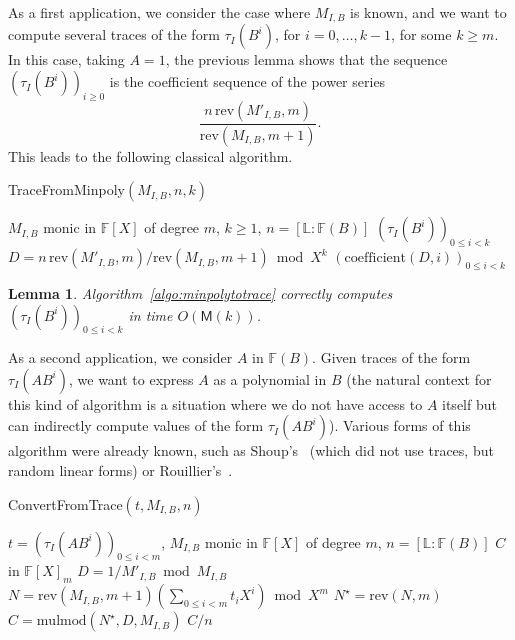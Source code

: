 \documentclass[12pt]{article}
\def\M {\ensuremath{\mathsf{M}}}
\def\F {\ensuremath{\mathbb{F}}}
\def\L {\ensuremath{\mathbb{L}}}
\def\coeff {\ensuremath{\mathrm{coefficient}}}
\def\mulmod {\ensuremath{\mathrm{mulmod}}}
\def\rev {\ensuremath{\mathrm{rev}}}
\newtheorem{Lemma}{Lemma}
\begin{document}
As a first application, we consider the case where $M_{I,B}$ is known,
and we want to compute several traces of the form $\tau_I(B^i)$, for
$i=0,\dots,k-1$, for some $k \ge m$. In this case, taking $A=1$, the
previous lemma shows that the sequence $(\tau_I(B^i))_{i \ge 0}$ is
the coefficient sequence of the power series
  $$ \frac{n\, \rev(M'_{I,B} ,m)}{\rev(M_{I,B},m+1)}.$$ This leads to
the following classical algorithm.

\begin{algorithm}[H]
  \caption{TraceFromMinpoly$(M_{I,B}, n, k)$}
  \begin{algorithmic}[1]
    \REQUIRE  $M_{I,B}$ monic in $\F[X]$ of degree $m$, $k \ge 1$, $n=[\L:\F(B)]$    
    \ENSURE $(\tau_I(B^i))_{0 \le i < k}$
    \STATE\label{algo:minpolytotrace:1} $D = n\, \rev(M'_{I,B}, m)/\rev(M_{I,B}, m+1) \bmod X^k$
    \RETURN $(\coeff(D,i))_{0 \le i < k}$
  \end{algorithmic}
  \label{algo:minpolytotrace}
\end{algorithm}

\begin{Lemma}\label{lemma:computetrace}
  Algorithm~\ref{algo:minpolytotrace} correctly computes
  $(\tau_I(B^i))_{0 \le i < k}$ in time $O(\M(k))$.
\end{Lemma}

As a second application, we consider $A$ in $\F(B)$. Given traces of
the form $\tau_I(A B^i)$, we want to express $A$ as a polynomial in
$B$ (the natural context for this kind of algorithm is a situation
where we do not have access to $A$ itself but can indirectly compute
values of the form $\tau_I(A B^i)$). Various forms of this algorithm
were already known, such as Shoup's~\cite{shoup94} (which did not use
traces, but random linear forms) or Rouillier's~\cite{rouiller99}.

\begin{algorithm}[H]
  \caption{ConvertFromTrace$(t, M_{I,B}, n)$}
  \begin{algorithmic}[1]
    \REQUIRE  $t=(\tau_I(A B^i))_{0 \le i < m}$, $M_{I,B}$ monic in $\F[X]$ of degree $m$, $n=[\L:\F(B)]$
    \ENSURE $C$ in $\F[X]_m$
    \STATE $D =  1/M'_{I,B} \bmod M_{I,B}$
    \STATE $N=\rev(M_{I,B}, m+1)( \sum_{0 \le i <m} t_i X^i) \bmod X^m$
    \STATE $N^\star = \rev(N, m)$
    \STATE $C=\mulmod(N^\star, D, M_{I,B})$
    \RETURN $C/n$
  \end{algorithmic}
  \label{algo:tracetopoly}
\end{algorithm}
\end{document}

